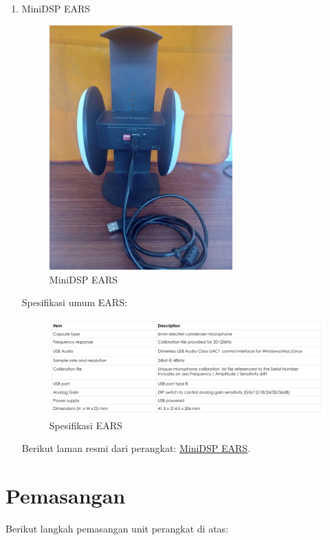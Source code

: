 \documentclass[12pt]{book}
\begin{document}
\begin{enumerate}
        \item MiniDSP EARS
         \begin{figure}[!ht]
			\centering
			\includegraphics[width=200pt,angle=-90]{images/unit/ears}
			\caption{MiniDSP EARS}
		\end{figure}

		Spesifikasi umum EARS:

		\begin{figure}[!ht]
			\centering
			\includegraphics[width=\textwidth]{images/unit/earspec}
			\caption{Spesifikasi EARS}
		\end{figure}

		Berikut laman resmi dari perangkat: \href{https://www.minidsp.com/products/acoustic-measurement/ears-headphone-jig}{MiniDSP EARS}.


     \end{enumerate}

	\newpage
    \section{Pemasangan}

	Berikut langkah pemasangan unit perangkat di atas:
\end{document}
